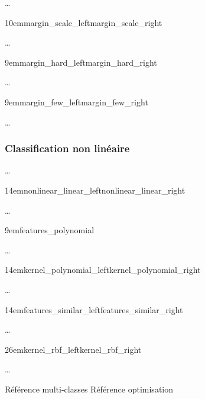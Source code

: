 …

{10em}{margin_scale_left}{margin_scale_right}

…

{9em}{margin_hard_left}{margin_hard_right}

…

{9em}{margin_few_left}{margin_few_right}

…

\subsubsection{Classification non linéaire}

…

{14em}{nonlinear_linear_left}{nonlinear_linear_right}

…

{9em}{features_polynomial}

…

{14em}{kernel_polynomial_left}{kernel_polynomial_right}

…

{14em}{features_similar_left}{features_similar_right}

…

{26em}{kernel_rbf_left}{kernel_rbf_right}

…

Référence multi-classes \cite{multi-class}
Référence optimisation \cite{mri} \cite{optimization}
\cite{svm}

\pagebreak
